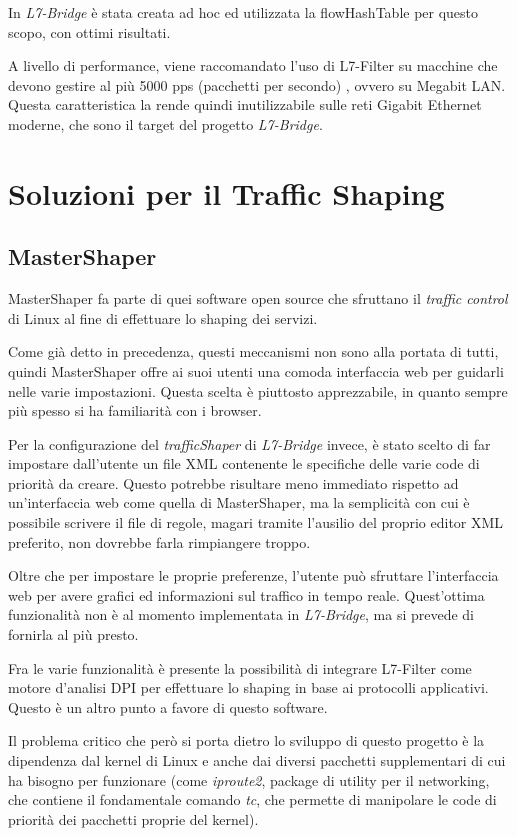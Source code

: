 In \emph{L7-Bridge} è stata creata ad hoc ed utilizzata la flowHashTable per questo scopo, con ottimi risultati.

A livello di performance, viene raccomandato l'uso di L7-Filter su macchine che devono gestire al più 5000 pps (pacchetti per secondo) \cite{gheorghe}, ovvero su Megabit LAN. Questa caratteristica la rende quindi inutilizzabile sulle reti Gigabit Ethernet moderne, che sono il target del progetto \emph{L7-Bridge}.

\section{Soluzioni per il Traffic Shaping}

\subsection{MasterShaper}

MasterShaper \cite{ms} fa parte di quei software open source che sfruttano il \emph{traffic control} di Linux al fine di effettuare lo shaping dei servizi.

Come già detto in precedenza, questi meccanismi non sono alla portata di tutti, quindi MasterShaper offre ai suoi utenti una comoda interfaccia web per guidarli nelle varie impostazioni. Questa scelta è piuttosto apprezzabile, in quanto sempre più spesso si ha familiarità con i browser.

Per la configurazione del \emph{trafficShaper} di \emph{L7-Bridge} invece, è stato scelto di far impostare dall'utente un file XML contenente le specifiche delle varie code di priorità da creare. Questo potrebbe risultare meno immediato rispetto ad un'interfaccia web come quella di MasterShaper, ma la semplicità con cui è possibile scrivere il file di regole, magari tramite l'ausilio del proprio editor XML preferito, non dovrebbe farla rimpiangere troppo.

Oltre che per impostare le proprie preferenze, l'utente può sfruttare l'interfaccia web per avere grafici ed informazioni sul traffico in tempo reale. Quest'ottima funzionalità non è al momento implementata in \emph{L7-Bridge}, ma si prevede di fornirla al più presto.

Fra le varie funzionalità è presente la possibilità di integrare L7-Filter come motore d'analisi DPI per effettuare lo shaping in base ai protocolli applicativi. Questo è un altro punto a favore di questo software.

Il problema critico che però si porta dietro lo sviluppo di questo progetto è la dipendenza dal kernel di Linux e anche dai diversi pacchetti supplementari di cui ha bisogno per funzionare (come \emph{iproute2}, package di utility per il networking, che contiene il fondamentale comando \emph{tc}, che permette di manipolare le code di priorità dei pacchetti proprie del kernel).


